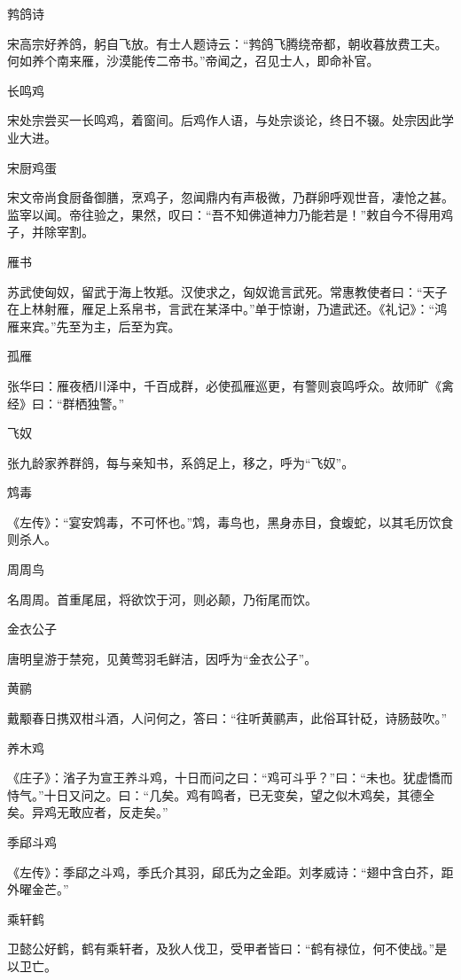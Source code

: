 \documentclass[a4paper,12pt,UTF8,twoside]{ctexbook}
\begin{document}
    鹁鸽诗
    
    宋高宗好养鸽，躬自飞放。有士人题诗云：“鹁鸽飞腾绕帝都，朝收暮放费工夫。何如养个南来雁，沙漠能传二帝书。”帝闻之，召见士人，即命补官。
    
    长鸣鸡
    
    宋处宗尝买一长鸣鸡，着窗间。后鸡作人语，与处宗谈论，终日不辍。处宗因此学业大进。
    
    宋厨鸡蛋
    
    宋文帝尚食厨备御膳，烹鸡子，忽闻鼎内有声极微，乃群卵呼观世音，凄怆之甚。监宰以闻。帝往验之，果然，叹曰：“吾不知佛道神力乃能若是！”敕自今不得用鸡子，并除宰割。
    
    雁书
    
    苏武使匈奴，留武于海上牧羝。汉使求之，匈奴诡言武死。常惠教使者曰：“天子在上林射雁，雁足上系帛书，言武在某泽中。”单于惊谢，乃遣武还。《礼记》：“鸿雁来宾。”先至为主，后至为宾。
    
    孤雁
    
    张华曰：雁夜栖川泽中，千百成群，必使孤雁巡更，有警则哀鸣呼众。故师旷《禽经》曰：“群栖独警。”
    
    飞奴
    
    张九龄家养群鸽，每与亲知书，系鸽足上，移之，呼为“飞奴”。
    
    鸩毒
    
    《左传》：“宴安鸩毒，不可怀也。”鸩，毒鸟也，黑身赤目，食蝮蛇，以其毛历饮食则杀人。
    
    周周鸟
    
    名周周。首重尾屈，将欲饮于河，则必颠，乃衔尾而饮。
    
    金衣公子
    
    唐明皇游于禁宛，见黄莺羽毛鲜洁，因呼为“金衣公子”。
    
    黄鹂
    
    戴颙春日携双柑斗酒，人问何之，答曰：“往听黄鹂声，此俗耳针砭，诗肠鼓吹。”
    
    养木鸡
    
    《庄子》：渻子为宣王养斗鸡，十日而问之曰：“鸡可斗乎？”曰：“未也。犹虚憍而恃气。”十日又问之。曰：“几矣。鸡有鸣者，已无变矣，望之似木鸡矣，其德全矣。异鸡无敢应者，反走矣。”
    
    季郈斗鸡
    
    《左传》：季郈之斗鸡，季氏介其羽，郈氏为之金距。刘孝威诗：“翅中含白芥，距外曜金芒。”
    
    乘轩鹤
    
    卫懿公好鹤，鹤有乘轩者，及狄人伐卫，受甲者皆曰：“鹤有禄位，何不使战。”是以卫亡。
    
\end{document}
